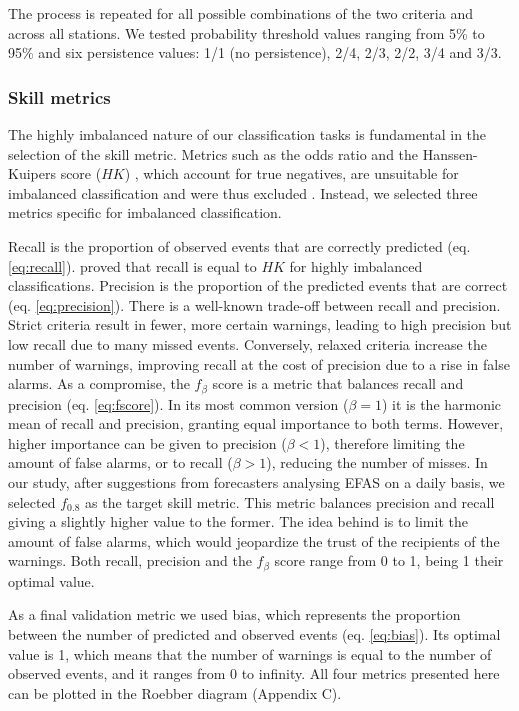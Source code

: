 \documentclass{ametsocV6.1}
\begin{document}
The process is repeated for all possible combinations of the two criteria and across all stations. We tested probability threshold values ranging from 5\% to 95\% and six persistence values: 1/1 (no persistence), 2/4, 2/3, 2/2, 3/4 and 3/3.

\subsubsection{Skill metrics}
\label{sec:methods_skill_metrics}

The highly imbalanced nature of our classification tasks is fundamental in the selection of the skill metric. Metrics such as the odds ratio and the Hanssen-Kuipers score ($HK$) \citep{Hanssen1965}, which account for true negatives, are unsuitable for imbalanced classification and were thus excluded . Instead, we selected three metrics specific for imbalanced classification. 

Recall is the proportion of observed events that are correctly predicted (eq. \ref{eq:recall}). \citet{Bartholmes2009} proved that recall is equal to $HK$ for highly imbalanced classifications. Precision is the proportion of the predicted events that are correct (eq. \ref{eq:precision}). There is a well-known trade-off between recall and precision. Strict criteria result in fewer, more certain warnings, leading to high precision but low recall due to many missed events. Conversely, relaxed criteria increase the number of warnings, improving recall at the cost of precision due to a rise in false alarms. As a compromise, the $f_{\beta}$ score  is a metric that balances recall  and precision (eq. \ref{eq:fscore}). In its most common version ($\beta = 1$) it is the harmonic mean of recall and precision, granting equal importance to both terms. However, higher importance can be given to precision ($\beta < 1$), therefore limiting the amount of false alarms, or to recall ($\beta > 1$), reducing the number of misses. In our study, after suggestions from forecasters analysing EFAS on a daily basis, we selected $f_{0.8}$ as the target skill metric. This metric balances precision and recall giving a slightly higher value to the former. The idea behind is to limit the amount of false alarms, which would jeopardize the trust of the recipients of the warnings. Both recall, precision and the $f_\beta$ score range from 0 to 1, being 1 their optimal value.

As a final validation metric we used bias, which represents the proportion between the number of predicted and observed events  (eq. \ref{eq:bias}). Its optimal value is 1, which means that the number of warnings is equal to the number of observed events, and it ranges from 0 to infinity. All four metrics presented here can be plotted in the Roebber diagram \citep{Roebber2009} (Appendix C).
\end{document}
